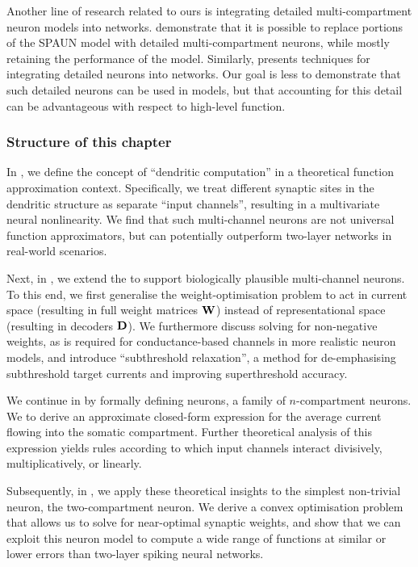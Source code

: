 Another line of research related to ours is integrating detailed multi-compartment neuron models into \NEF networks.
 demonstrate that it is possible to replace portions of the SPAUN model \citep{eliasmith2012largescale} with detailed multi-compartment neurons, while mostly retaining the performance of the model. Similarly, \citet{duggins2017incorporating} presents techniques for integrating detailed neurons into \NEF networks.
Our goal is less to demonstrate that such detailed neurons can be used in \NEF models, but that accounting for this detail can be advantageous with respect to high-level function.

\subsubsection{Structure of this chapter}
In , we define the concept of \enquote{dendritic computation} in a theoretical function approximation context.
Specifically, we treat different synaptic sites in the dendritic structure as separate \enquote{input channels}, resulting in a multivariate neural nonlinearity.
We find that such multi-channel neurons are not universal function approximators, but can potentially outperform two-layer networks in real-world scenarios.

Next, in , we extend the \NEF to support biologically plausible multi-channel neurons.
To this end, we first generalise the weight-optimisation problem to act in current space (resulting in full weight matrices $\mathbf{W}$) instead of representational space (resulting in decoders $\mathbf{D}$).
We furthermore discuss solving for non-negative weights, as is required for conductance-based channels in more realistic neuron models, and introduce \enquote{subthreshold relaxation}, a method for de-emphasising subthreshold target currents and improving superthreshold accuracy.

We continue in  by formally defining \nlif neurons, a family of $n$-compartment \LIF neurons.
We to derive an approximate closed-form expression for the average current flowing into the somatic compartment.
Further theoretical analysis of this expression yields rules according to which input channels interact divisively, multiplicatively, or linearly.

Subsequently, in , we apply these theoretical insights to the simplest non-trivial \nlif neuron, the two-compartment \LIF neuron.
We derive a convex optimisation problem that allows us to solve for near-optimal synaptic weights, and show that we can exploit this neuron model to compute a wide range of functions at similar or lower errors than two-layer spiking neural networks.

